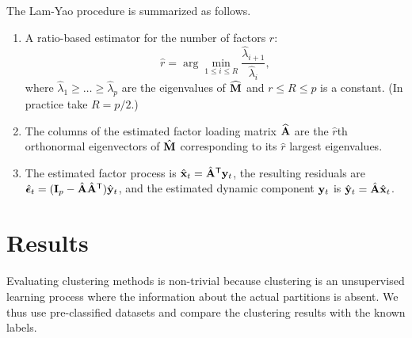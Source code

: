 \documentclass{article} %
\begin{document}
The Lam-Yao procedure is summarized as follows.
\begin{enumerate}
\item A ratio-based estimator for the number of factors $r$:
\[{\hat r}=\arg\min_{1\leq i\leq R}\frac{{\hat\lambda}_{i+1}}{{\hat\lambda}_i},\]
where ${\hat\lambda}_1\geq\ldots\geq {\hat\lambda}_p$ are the eigenvalues of ${\widehat{\bf M}}$ and $r\leq R\leq p$ is a constant. (In practice take $R=p/2$.)
\item The columns of the estimated factor loading matrix ${\widehat{\bf A}}$ are the $\hat{r}$th orthonormal eigenvectors of $\hat{\bf M}$ corresponding to its $\hat{r}$ largest eigenvalues.
\item The estimated factor process is ${\hat{\bf x}}_t={\hat{\bf A}}^{\sf T}{\bf y}_t$, the resulting residuals are $\hat{\bm\epsilon}_t=({\bf I}_p-{\hat{\bf A}}{\hat{\bf A}}^{\sf T}){\hat{\bf y}}_t$, and the estimated dynamic component ${{\bf y}}_t$ is ${\hat{\bf y}}_t={\hat{\bf A}}{\hat{\bf x}}_t$.
\end{enumerate}

\section{Results}
Evaluating clustering methods is non-trivial because clustering is an unsupervised learning process where the information about the actual partitions is absent. We thus use pre-classified datasets and compare the clustering results with the known labels. 
\end{document}
